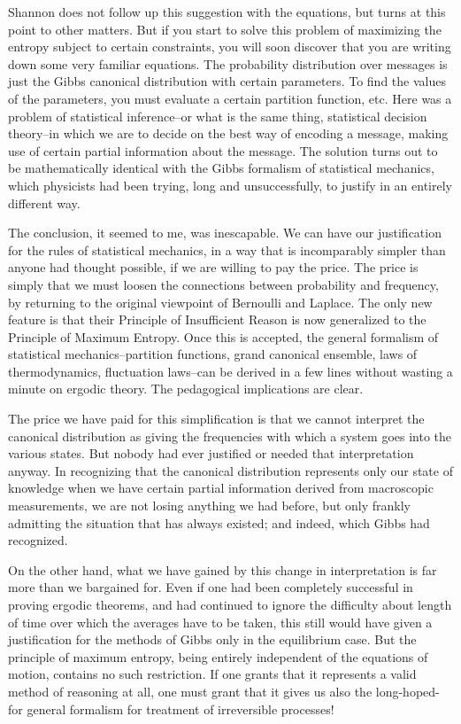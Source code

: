 Shannon does not follow up this suggestion with the equations, but turns at this point to other matters.
But if you start to solve this problem of maximizing the entropy subject to certain constraints, you will soon discover that you are writing down some very familiar equations.
The probability distribution over messages is just the Gibbs canonical distribution with certain parameters.
To find the values of the parameters, you must evaluate a certain partition function, etc.
Here was a problem of statistical inference--or what is the same thing, statistical decision theory--in which we are to decide on the best way of encoding a message, making use of certain partial information about the message.
The solution turns out to be mathematically identical with the Gibbs formalism of statistical mechanics, which physicists had been trying, long and unsuccessfully, to justify in an entirely different way.

The conclusion, it seemed to me, was inescapable.
We can have our justification for the rules of statistical mechanics, in a way that is incomparably simpler than anyone had thought possible, if we are willing to pay the price.
The price is simply that we must loosen the connections between probability and frequency, by returning to the original viewpoint of Bernoulli and Laplace.
The only new feature is that their Principle of Insufficient Reason is now generalized to the Principle of Maximum Entropy.
Once this is accepted, the general formalism of statistical mechanics--partition functions, grand canonical ensemble, laws of thermodynamics, fluctuation laws--can be derived in a few lines without wasting a minute on ergodic theory.
The pedagogical implications are clear.

The price we have paid for this simplification is that we cannot interpret the canonical distribution as giving the frequencies with which a system goes into the various states.
But nobody had ever justified or needed that interpretation anyway.
In recognizing that the canonical distribution represents only our state of knowledge when we have certain partial information derived from macroscopic measurements, we are not losing anything we had before, but only frankly admitting the situation that has always existed; and indeed, which Gibbs had recognized.

On the other hand, what we have gained by this change in interpretation is far more than we bargained for.
Even if one had been completely successful in proving ergodic theorems, and had continued to ignore the difficulty about length of time over which the averages have to be taken, this still would have given a justification for the methods of Gibbs only in the equilibrium case.
But the principle of maximum entropy, being entirely independent of the equations of motion, contains no such restriction.
If one grants that it represents a valid method of reasoning at all, one must grant that it gives us also the long-hoped-for general formalism for treatment of irreversible processes!


